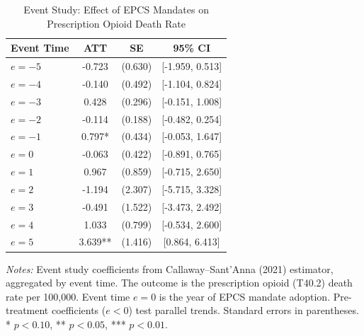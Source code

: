\begin{table}[H]
\centering
\caption{Event Study: Effect of EPCS Mandates on Prescription Opioid Death Rate}
\label{tab:eventstudy}
\begin{threeparttable}
\begin{tabular}{lccc}
\toprule
Event Time & ATT & SE & 95\% CI \\
\midrule
$e = -5$ & -0.723 & (0.630) & [-1.959, 0.513] \\
$e = -4$ & -0.140 & (0.492) & [-1.104, 0.824] \\
$e = -3$ & 0.428 & (0.296) & [-0.151, 1.008] \\
$e = -2$ & -0.114 & (0.188) & [-0.482, 0.254] \\
\addlinespace
$e = -1$ & 0.797* & (0.434) & [-0.053, 1.647] \\
\addlinespace
$e = 0$ & -0.063 & (0.422) & [-0.891, 0.765] \\
$e = 1$ & 0.967 & (0.859) & [-0.715, 2.650] \\
$e = 2$ & -1.194 & (2.307) & [-5.715, 3.328] \\
$e = 3$ & -0.491 & (1.522) & [-3.473, 2.492] \\
$e = 4$ & 1.033 & (0.799) & [-0.534, 2.600] \\
$e = 5$ & 3.639** & (1.416) & [0.864, 6.413] \\
\bottomrule
\end{tabular}
\begin{tablenotes}[flushleft]
\small
\item \textit{Notes:} Event study coefficients from Callaway--Sant'Anna (2021) estimator, aggregated by event time. The outcome is the prescription opioid (T40.2) death rate per 100,000. Event time $e = 0$ is the year of EPCS mandate adoption. Pre-treatment coefficients ($e < 0$) test parallel trends. Standard errors in parentheses. * $p<0.10$, ** $p<0.05$, *** $p<0.01$.
\end{tablenotes}
\end{threeparttable}
\end{table}

